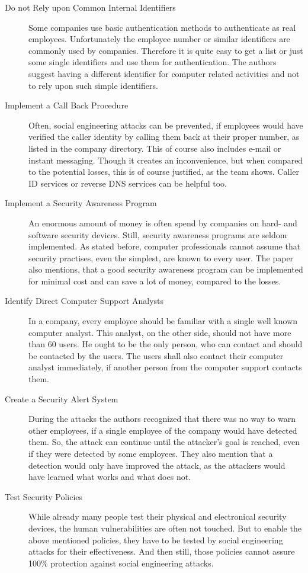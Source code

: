 \begin{description}
  \item[Do not Rely upon Common Internal Identifiers] Some companies use basic
  authentication methods to authenticate as real employees. Unfortunately the
  employee number or similar identifiers are commonly used by companies.
  Therefore it is quite easy to get a list or just some single identifiers and
  use them for authentication. The authors suggest having a different
  identifier for computer related activities and not to rely upon such simple
  identifiers.
  \item[Implement a Call Back Procedure] Often, social engineering attacks can
  be prevented, if employees would have verified the caller identity by calling
  them back at their proper number, as listed in the company directory. This of
  course also includes e-mail or instant messaging. Though it creates an
  inconvenience, but when compared to the potential losses, this is of course
  justified, as the team shows. Caller ID services or reverse DNS services can
  be helpful too.
  \item[Implement a Security Awareness Program] An enormous amount of money is
  often spend by companies on hard- and software security devices. Still, security
  awareness programs are seldom implemented. As stated before, computer
  professionals cannot assume that security practises, even the simplest, are
  known to every user. The paper also mentions, that a good security awareness
  program can be implemented for minimal cost and can save a lot of money,
  compared to the losses.
  \item[Identify Direct Computer Support Analysts] In a company, every employee
  should be familiar with a single well known computer analyst. This analyst, on
  the other side, should not have more than 60 users. He ought to be the only
  person, who can contact and should be contacted by the users. The users
  shall also contact their computer analyst immediately, if another person
  from the computer support contacts them.
  \item[Create a Security Alert System] During the attacks the authors 
  recognized that there was no way to warn other employees, if a single
  employee of the company would have detected them. So, the attack can
  continue until the attacker's goal is reached, even if they were detected by some
  employees. They also mention that a detection would only have improved the
  attack, as the attackers would have learned what works and what does
  not.
  \item[Test Security Policies] While already many people test their physical
  and electronical security devices, the human vulnerabilities are often not
  touched. But to enable the above mentioned policies, they have to be tested
  by social engineering attacks for their effectiveness. And then still, those
  policies cannot assure 100\% protection against social engineering attacks.
\end{description}

